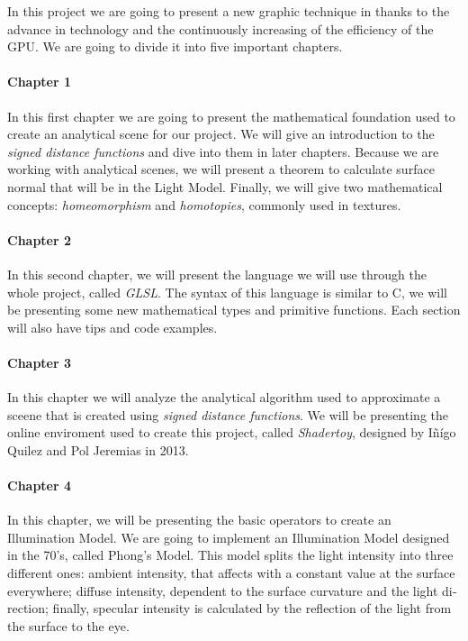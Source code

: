\begin{otherlanguage}{english}
In this project we are going to present a new graphic technique in thanks to the advance in technology and the continuously increasing of the efficiency of the GPU. We are going to divide it into five important chapters.

\paragraph{Chapter 1} In this first chapter we are going to present the mathematical foundation used to create an analytical scene for our project. We will give an introduction to the \textit{signed distance functions} and dive into them in later chapters. Because we are working with analytical scenes, we will present a theorem to calculate surface normal that will be in the Light Model. Finally, we will give two mathematical concepts: \textit{homeomorphism} and \textit{homotopies}, commonly used in textures.

\paragraph{Chapter 2} In this second chapter, we will present the language we will use through the whole project, called \textit{GLSL}. The syntax of this language is similar to C, we will be presenting some new mathematical types and primitive functions. Each section will also have tips and code examples.

\paragraph{Chapter 3} In this chapter we will analyze the analytical algorithm used to approximate a sceene that is created using \textit{signed distance functions}. We will be presenting the online enviroment used to create this project, called \textit{Shadertoy}, designed by Iñígo Quilez and Pol Jeremias in 2013.

\paragraph{Chapter 4} In this chapter, we will be presenting the basic operators to create an Illumination Model. We are going to implement an Illumination Model designed in the 70's, called Phong's Model. This model splits the light intensity into three different ones: ambient intensity, that affects with a constant value at the surface everywhere; diffuse intensity, dependent to the surface curvature and the light direction; finally, specular intensity is calculated by the reflection of the light from the surface to the eye.


\end{otherlanguage}

